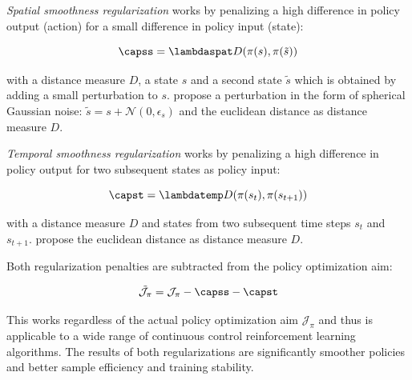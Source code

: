 \textit{Spatial smoothness regularization} works by penalizing a high difference in policy output (action) for a small difference in policy input (state):

\begin{equation}
  \capss = \lambdaspat D(\pi(s), \pi(\tilde s))
\end{equation}

with a distance measure $D$, a state $s$ and a second state $\tilde s$ which is obtained by adding a small perturbation to $s$. \citet{mysoreRegularizingActionPolicies2021} propose a perturbation in the form of spherical Gaussian noise: $\tilde s = s + \mathcal{N}(0, \epsilon_{s})$ and the euclidean distance as distance measure $D$.

\textit{Temporal smoothness regularization} works by penalizing a high difference in policy output for two subsequent states as policy input:

\begin{equation}
  \capst = \lambdatemp D(\pi(s_t), \pi(s_{t+1}))
\end{equation}

with a distance measure $D$ and states from two subsequent time steps $s_t$ and $s_{t+1}$. \citet{mysoreRegularizingActionPolicies2021} propose the euclidean distance as distance measure $D$.

Both regularization penalties are subtracted from the policy optimization aim:

\begin{equation}
  \mathcal{\tilde J}_{\pi} = \mathcal{J}_{\pi} - \capss - \capst
  \label{eq:smoothness-regularized-policy}
\end{equation}

This works regardless of the actual policy optimization aim $\mathcal{J}_{\pi}$ and thus is applicable to a wide range of continuous control reinforcement learning algorithms. The results of both regularizations are significantly smoother policies and better sample efficiency and training stability.


